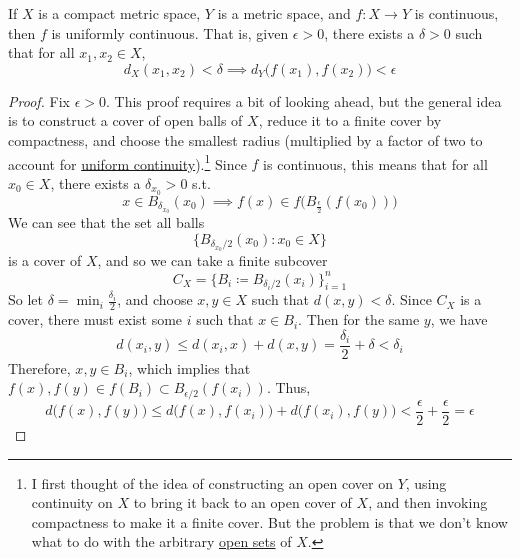   \begin{theorem}
    \label{thm:uniform-continuity-theorem}
    If $X$ is a compact metric space, $Y$ is a metric space, and $f: X \rightarrow Y$ is continuous, then $f$ is uniformly continuous. That is, given $\epsilon > 0$, there exists a $\delta > 0$ such that for all $x_1, x_2 \in X$, 
    \begin{equation}
      d_X (x_1, x_2) < \delta \implies d_Y \big( f(x_1), f(x_2)\big) < \epsilon
    \end{equation}
  \end{theorem}
	\begin{proof}
		Fix $\epsilon > 0$. This proof requires a bit of looking ahead, but the general idea is to construct a cover of open balls of $X$, reduce it to a finite cover by compactness, and choose the smallest radius (multiplied by a factor of two to account for \hyperref[thm:uniform-continuity-theorem]{uniform continuity}).\footnote{I first thought of the idea of constructing an open cover on $Y$, using continuity on $X$ to bring it back to an open cover of $X$, and then invoking compactness to make it a finite cover. But the problem is that we don't know what to do with the arbitrary \hyperref[def:open-set]{open sets} of $X$.} Since $f$ is continuous, this means that for all $x_0 \in X$, there exists a $\delta_{x_0} > 0$ s.t. 
		\begin{equation}
			x \in B_{\delta_{x_0}} (x_0) \implies f(x) \in f\big( B_{\frac{\epsilon}{2}} (f(x_0)) \big)
		\end{equation} 
		We can see that the set all balls 
		\begin{equation}
			\{ B_{\delta_{x_0}/2} (x_0) \colon x_0 \in X \}
		\end{equation}
		is a cover of $X$, and so we can take a finite subcover 
		\begin{equation}
			C_X = \{ B_i \coloneqq B_{\delta_i / 2} (x_i) \}_{i=1}^n
		\end{equation} 
		So let $\delta = \min_i \frac{\delta_i}{2}$, and choose $x, y \in X$ such that $d(x, y) < \delta$. Since $C_X$ is a cover, there must exist some $i$ such that $x \in B_i$. Then for the same $y$, we have 
		\begin{equation}
			d(x_i, y) \leq d(x_i, x) + d(x, y) = \frac{\delta_i}{2} + \delta < \delta_i
		\end{equation}
		Therefore, $x, y \in B_i$, which implies that $f(x), f(y) \in f(B_i) \subset B_{\epsilon/2} (f(x_i))$. Thus, 
		\begin{equation}
			d\big( f(x), f(y) \big) \leq d \big( f(x), f(x_i) \big) + d \big( f(x_i), f(y) \big) < \frac{\epsilon}{2} + \frac{\epsilon}{2} = \epsilon
		\end{equation}
	\end{proof} 

